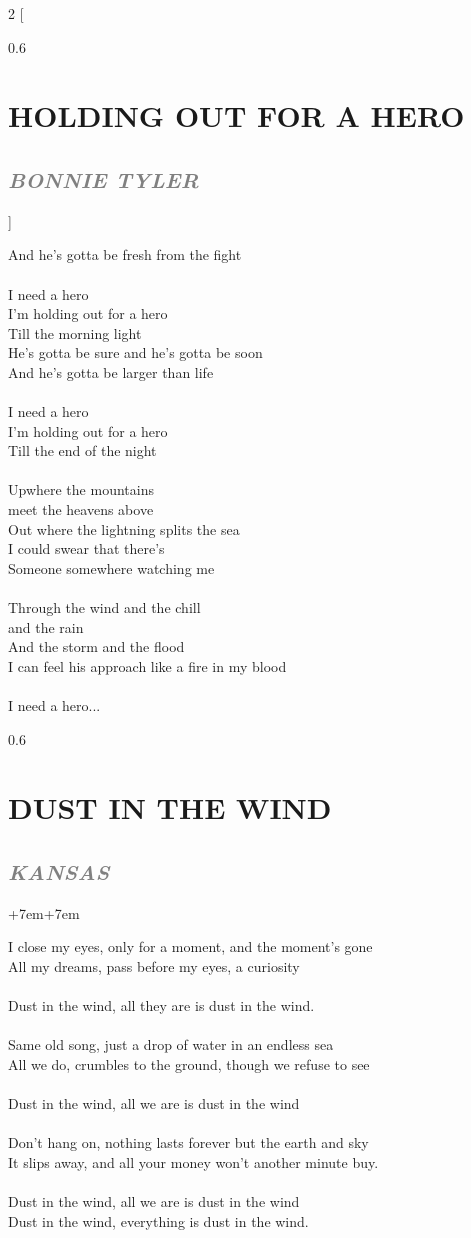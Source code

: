\documentclass[100pt,a4paper]{report}
\newenvironment{song2}[2]
	{	
    	\begin{multicols*}{2}
		[
			\begin{spacing}{0.6}
				\section*{\LARGE\centering \MakeUppercase{\textbf{{#1}}}}
				\subsection*{\Large\centering \textit{\textcolor{gray}{\MakeUppercase{{#2}}}}}
			\end{spacing}
		]
		\Large
	}
	{
	\end{multicols*}
	\newpage
    }
\newenvironment{song1}[3]
	{
			\begin{spacing}{0.6}
				\section*{\LARGE\centering \MakeUppercase{\textbf{{#1}}}}
				\subsection*{\Large\centering \textit{\textcolor{gray}{\MakeUppercase{{#2}}}}}
			\end{spacing}
			\vspace{0.8cm}
			\begin{adjustwidth}{+7em}{+7em}
			\Large
			
	}
	{
		\end{adjustwidth}
		\newpage
    }
\begin{document}
\begin{song2}{holding out for a hero}{bonnie tyler}
And he's gotta be fresh from the fight\\
\\
I need a hero\\
I'm holding out for a hero\\
Till the morning light\\
He's gotta be sure and he's gotta be soon\\
And he's gotta be larger than life\\
\\
I need a hero\\
I'm holding out for a hero\\
Till the end of the night\\
\\
Upwhere the mountains\\ 
meet the heavens above\\
Out where the lightning splits the sea\\
I could swear that there's\\
Someone somewhere watching me\\
\\
Through the wind and the chill\\ 
and the rain\\
And the storm and the flood\\
I can feel his approach like a fire in my blood\\
\\
I need a hero...
\end{song2}

\begin{song1}{dust in the wind}{kansas}
\noindent
I close my eyes, only for a moment, and the moment's gone\\
All my dreams, pass before my eyes, a curiosity\\
\\
Dust in the wind, all they are is dust in the wind.\\
\\
Same old song, just a drop of water in an endless sea\\
All we do, crumbles to the ground, though we refuse to see\\
\\
Dust in the wind, all we are is dust in the wind\\
\\
Don't hang on, nothing lasts forever but the earth and sky\\
It slips away, and all your money won't another minute buy.\\
\\
Dust in the wind, all we are is dust in the wind\\
Dust in the wind, everything is dust in the wind. \\
\end{song1}
\end{document}
